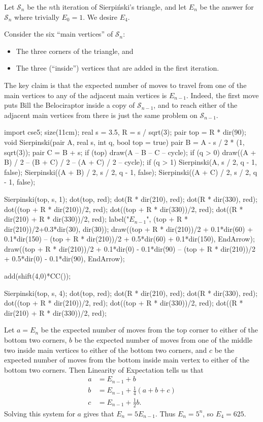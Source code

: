 Let $\mathcal{S}_n$ be the $n$th iteration of Sierpi\'nski's triangle, and let $E_n$ be the answer for $\mathcal{S}_n$ where trivially $E_0=1$. We desire $E_4$.
	
	Consider the six ``main vertices'' of $\mathcal{S}_n$:
	\begin{itemize}
		\item The three corners of the triangle, and
		\item The three (``inside'') vertices that are added in the first iteration.
	\end{itemize}
	The key claim is that the expected number of moves to travel from one of the main vertices to any of the adjacent main vertices is $E_{n-1}$. Indeed, the first move puts Bill the Belociraptor inside a copy of $\mathcal{S}_{n-1}$, and to reach either of the adjacent main vertices from there is just the same problem on $\mathcal{S}_{n-1}$.
	\begin{center}
		\begin{asy}
			import cse5;
			size(11cm);
			real s = 3.5, R = s / sqrt(3);
			pair top = R * dir(90);
			void Sierpinski(pair A, real s, int q, bool top = true) {
				pair B = A - s / 2 * (1, sqrt(3));
				pair C = B + s;
				if (top) draw(A -- B -- C -- cycle);
				if (q > 0) draw((A + B) / 2 -- (B + C) / 2 -- (A + C) / 2 -- cycle);
				if (q > 1) {
					Sierpinski(A, s / 2, q - 1, false);
					Sierpinski((A + B) / 2, s / 2, q - 1, false);
					Sierpinski((A + C) / 2, s / 2, q - 1, false);
				}
			}
			
			Sierpinski(top, s, 1);
			dot(top, red); dot(R * dir(210), red); dot(R * dir(330), red);
			dot((top + R * dir(210))/2, red); dot((top + R * dir(330))/2, red); dot((R * dir(210) + R * dir(330))/2, red);
			label("$E_{n-1}$", (top + R * dir(210))/2+0.3*dir(30), dir(30));
			draw((top + R * dir(210))/2 + 0.1*dir(60) + 0.1*dir(150) -- (top + R * dir(210))/2 + 0.5*dir(60) + 0.1*dir(150), EndArrow);
			draw((top + R * dir(210))/2 + 0.1*dir(0) - 0.1*dir(90) -- (top + R * dir(210))/2 + 0.5*dir(0) - 0.1*dir(90), EndArrow);
			
			add(shift(4,0)*CC());
			
			Sierpinski(top, s, 4);
			dot(top, red); dot(R * dir(210), red); dot(R * dir(330), red);
			dot((top + R * dir(210))/2, red); dot((top + R * dir(330))/2, red); dot((R * dir(210) + R * dir(330))/2, red);
		\end{asy}
	\end{center}
	Let $a=E_n$ be the expected number of moves from the top corner to either of the bottom two corners, $b$ be the expected number of moves from one of the middle two inside main vertices to either of the bottom two corners, and $c$ be the expected number of moves from the bottom inside main vertex to either of the bottom two corners. Then Linearity of Expectation tells us that
	\begin{align*}
		a &= E_{n-1} + b \\
		b &= E_{n-1} + \frac{1}{4}(a+b+c) \\
		c &= E_{n-1} + \frac{1}{2}b.
	\end{align*}
	Solving this system for $a$ gives that $E_n=5E_{n-1}$. Thus $E_n=5^n$, so $E_4=625$.
	